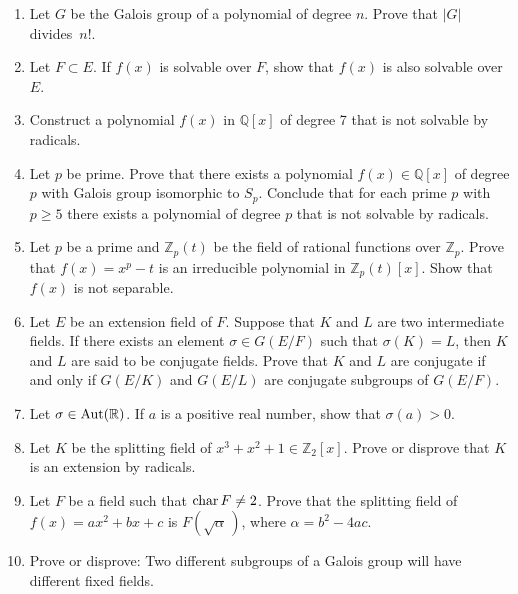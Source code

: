 {\begin{enumerate}
 
\item
Let $G$ be the Galois group of a polynomial of degree $n$.  Prove
that $|G|$ divides~$n!$.
 
 
\item
Let $F \subset E$.  If $f(x)$ is solvable over $F$, show that $f(x)$
is also solvable over $E$.
 
 
\item
Construct a polynomial $f(x)$ in ${\mathbb Q}[x]$ of degree 7 that is not
solvable by \linebreak radicals.
 
 
\item
Let $p$ be prime.  Prove that there exists a polynomial $f(x) \in
{\mathbb Q}[x]$ of degree $p$ with Galois group isomorphic to $S_p$.
Conclude that for each prime $p$ with $p \geq 5$ there exists a
polynomial of degree $p$ that is not solvable by radicals. 
 
 
\item
Let $p$ be a prime and ${\mathbb Z}_p(t)$ be the field of rational
functions over ${\mathbb Z}_p$.  Prove that $f(x) = x^p - t$ is an
irreducible polynomial in ${\mathbb Z}_p(t)[x]$.  Show that $f(x)$ is not
separable. 
 
 
\item
Let $E$ be an extension field of $F$. Suppose that $K$ and $L$ are two 
intermediate fields.  If there exists an element $\sigma \in G(E/F)$
such that $\sigma(K) = L$, then $K$ and $L$ are said to be {\bfi
conjugate fields}.
Prove that $K$ and $L$ are conjugate if and only if $G(E/K)$ and
$G(E/L)$ are conjugate subgroups of $G(E/F)$. 
 
 
\item 
Let $\sigma \in \operatorname{Aut}( {\mathbb R} )$.  If $a$ is a positive real
number, show that $\sigma( a) > 0$.
 
 
\item 
Let $K$ be the splitting field of $x^3 + x^2 + 1 \in {\mathbb Z}_2[x]$.
Prove or disprove that $K$ is an extension by radicals.
 
\item
Let $F$ be a field such that ${\rm char}\, F \neq 2$. Prove that the
splitting field of $f(x) = a x^2 + b x + c$ is $F( \sqrt{\alpha}\, )$,
where $\alpha = b^2 - 4ac$. 
 
 
\item
Prove or disprove: Two different subgroups of a Galois group will
have different fixed fields.
 
 
 

\end{enumerate}}
